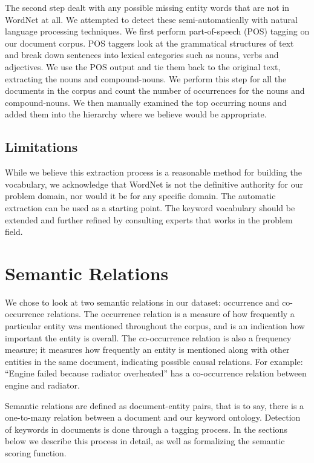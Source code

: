 The second step dealt with any possible missing entity words that are not in
WordNet at all. We attempted to detect these semi-automatically with natural
language processing techniques. We first perform part-of-speech (POS) tagging on our document 
corpus. POS taggers look at the grammatical structures of text and break down 
sentences into lexical categories such as nouns, verbs and adjectives. We use the 
POS output and tie them back to the original text, extracting the nouns and 
compound-nouns. We perform this step for all the documents in the corpus and 
count the number of occurrences for the nouns and compound-nouns. We then manually 
examined the top occurring nouns and added them into the hierarchy where we believe 
would be appropriate.

\subsection{Limitations}
While we believe this extraction process is a reasonable method for building the
vocabulary, we acknowledge that WordNet is not the definitive authority for our 
problem domain, nor would it be for any specific domain. The automatic
extraction can be used as a starting point. The keyword vocabulary should be
extended and further refined by consulting experts that works in the problem field. 



\section{Semantic Relations} 
We chose to look at two semantic relations in our dataset: occurrence and
co-occurrence relations. The occurrence relation is a measure of how frequently
a particular entity was mentioned throughout the corpus, and is an
indication how important the entity is overall. The co-occurrence relation is
also a frequency measure; it measures how frequently an entity is mentioned along
with other entities in the same document, indicating possible causal relations.
For example: ``Engine failed because radiator overheated'' has a co-occurrence
relation between engine and radiator.

Semantic relations are defined as document-entity pairs, that is to say, there
is a one-to-many relation between a document and our keyword ontology. Detection of
keywords in documents is done through a tagging process. In the sections below we
describe this process in detail, as well as formalizing the semantic scoring
function.
   

